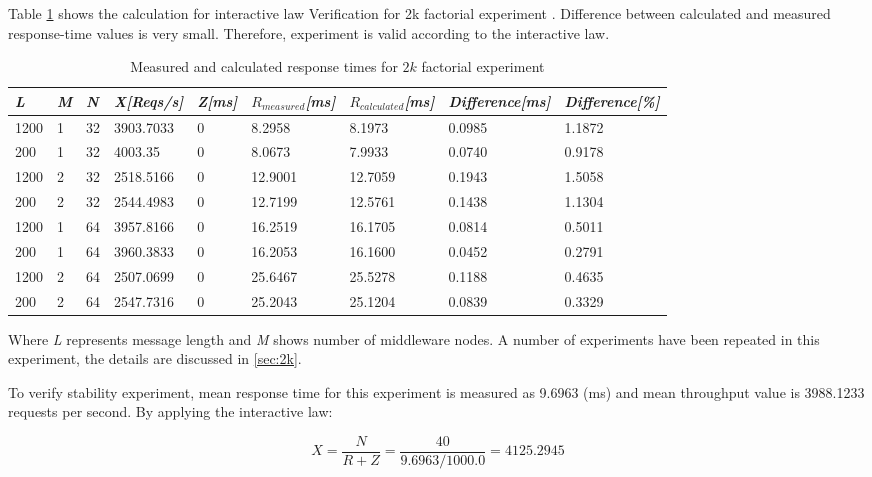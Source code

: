 \documentclass[11pt]{article}
\begin{document}
Table \ref{tbl:interactive-2k} shows the calculation for interactive law Verification 
for 2k factorial experiment  \cite[section~3.2]{ms1}. Difference between calculated and 
measured response-time values is very small. Therefore, experiment is valid according to the interactive law.

\begin{table}[!ht]
  \begin{tabular}{*9l}    \toprule
   \emph{L} &  \emph{M}  & \emph{N} & \emph{X[Reqs/s]} & \emph{Z[ms]} & \emph{$R_{measured}$[ms]} & \emph{$R_{calculated}$[ms]} &   \emph{Difference[ms]} & \emph{Difference[\%]} \\\midrule
       1200 &   1         &  32  & 3903.7033     & 0   & 8.2958 & 8.1973 & 0.0985 & 1.1872 \\
       200  &   1         &  32  & 4003.35       & 0   & 8.0673 & 7.9933 & 0.0740 & 0.9178 \\
       1200 &   2         &  32  & 2518.5166     & 0   & 12.9001& 12.7059& 0.1943& 1.5058 \\
       200  &   2         &  32  & 2544.4983     & 0   & 12.7199& 12.5761& 0.1438& 1.1304\\
       1200 &   1         &  64 &3957.8166 & 0         & 16.2519& 16.1705& 0.0814& 0.5011 \\
       200  &   1         &  64 & 3960.3833&  0        & 16.2053 & 16.1600& 0.0452& 0.2791\\
       1200 &   2         &  64 & 2507.0699& 0         & 25.6467 & 25.5278 & 0.1188& 0.4635 \\
        200 &   2         &  64 & 2547.7316& 0         & 25.2043  & 25.1204 & 0.0839& 0.3329 \\
    \hline
  \end{tabular}
  \centering
  \caption{Measured and calculated response times for $2k$ factorial experiment}
  \label{tbl:interactive-2k}
\end{table} Where \emph{L} represents message length and \emph{M} shows number of middleware nodes.
A number of experiments have been repeated in this experiment, the details are discussed in \cref{sec:2k}.

To verify stability experiment, mean response time for this experiment is measured as  
9.6963 (ms) and mean throughput value is 3988.1233 requests per second. By applying the interactive law: 

\begin{equation}
X=\frac{N}{R+Z} = \frac{40}{9.6963/1000.0} = 4125.2945
\end{equation} 
\end{document}

